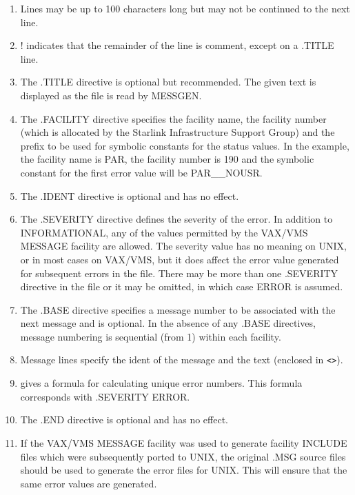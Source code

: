 \documentclass[11pt,nolof]{starlink}
\begin{document}
\begin{enumerate}
\item Lines may be up to 100 characters long but may not be continued to the
next line.
\item ! indicates that the remainder
of the line is comment, except on a .TITLE line.
\item The .TITLE directive is optional but recommended. The given text is
displayed as the file is read by MESSGEN.
\item The .FACILITY directive specifies the facility name, the facility number
(which is allocated by the Starlink Infrastructure Support Group) and the
prefix to be used for symbolic constants for the status values.
In the example, the facility name is PAR, the facility number is 190 and the
symbolic constant for the first error value will be PAR\_\_NOUSR.
\item The .IDENT directive is optional and has no effect.
\item The .SEVERITY directive defines the severity of the error. In addition
to INFORMATIONAL, any of the values permitted by the VAX/VMS MESSAGE facility
are allowed.
The severity value has no meaning on UNIX, or in most cases on VAX/VMS, but
it does affect the error value generated for subsequent errors in the file.
There may be more than one .SEVERITY directive in the file or it may be omitted,
in which case ERROR is assumed.
\item The .BASE directive specifies a message number to be associated with
the next message and is optional.
In the absence of any .BASE directives, message numbering is sequential
(from 1) within each facility.
\item Message lines specify the ident of the message and the text
(enclosed in \verb!<>!).
\item
{}
gives a formula for calculating unique error numbers. This formula
corresponds with .SEVERITY ERROR.
\item The .END directive is optional and has no effect.
\item If the VAX/VMS MESSAGE facility was used to generate facility INCLUDE
files which were subsequently ported to UNIX, the original
.MSG source files should be used to generate the error files for UNIX. This
will ensure that the same error values are generated.
\end{enumerate}
\end{document}
